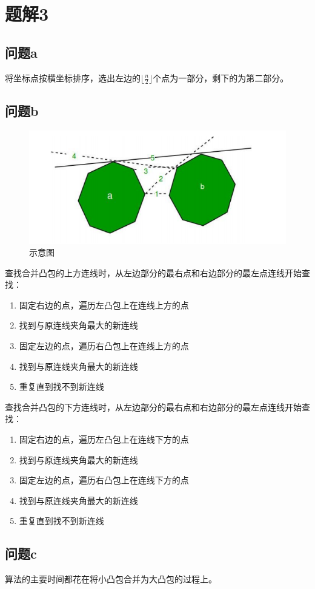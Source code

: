 \section{题解3}
\subsection{问题a}
将坐标点按横坐标排序，选出左边的$\lfloor\frac{n}{2}\rfloor$个点为一部分，剩下的为第二部分。

\subsection{问题b}
\begin{figure}[htbp]
    \centering
    \includegraphics[width=1\textwidth]{截图.png}
    \caption{示意图}
\end{figure}
查找合并凸包的上方连线时，从左边部分的最右点和右边部分的最左点连线开始查找：
\begin{enumerate}
    \item 固定右边的点，遍历左凸包上在连线上方的点
    \item 找到与原连线夹角最大的新连线
    \item 固定左边的点，遍历右凸包上在连线上方的点
    \item 找到与原连线夹角最大的新连线
    \item 重复直到找不到新连线
\end{enumerate}
查找合并凸包的下方连线时，从左边部分的最右点和右边部分的最左点连线开始查找：
\begin{enumerate}
    \item 固定右边的点，遍历左凸包上在连线下方的点
    \item 找到与原连线夹角最大的新连线
    \item 固定左边的点，遍历右凸包上在连线下方的点
    \item 找到与原连线夹角最大的新连线
    \item 重复直到找不到新连线
\end{enumerate}

\subsection{问题c}
算法的主要时间都花在将小凸包合并为大凸包的过程上。